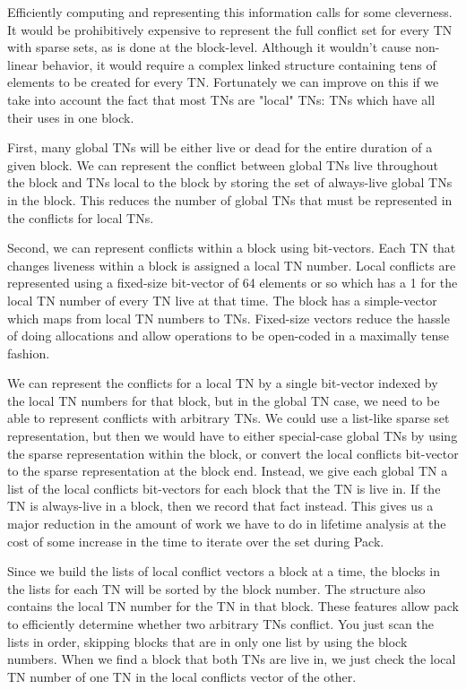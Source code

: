 Efficiently computing and representing this information calls for some
cleverness.  It would be prohibitively expensive to represent the full conflict
set for every TN with sparse sets, as is done at the block-level.  Although it
wouldn't cause non-linear behavior, it would require a complex linked structure
containing tens of elements to be created for every TN.  Fortunately we can
improve on this if we take into account the fact that most TNs are "local" TNs:
TNs which have all their uses in one block.

First, many global TNs will be either live or dead for the entire duration of a
given block.  We can represent the conflict between global TNs live throughout
the block and TNs local to the block by storing the set of always-live global
TNs in the block.  This reduces the number of global TNs that must be
represented in the conflicts for local TNs.

Second, we can represent conflicts within a block using bit-vectors.  Each TN
that changes liveness within a block is assigned a local TN number.  Local
conflicts are represented using a fixed-size bit-vector of 64 elements or so
which has a 1 for the local TN number of every TN live at that time.  The block
has a simple-vector which maps from local TN numbers to TNs.  Fixed-size
vectors reduce the hassle of doing allocations and allow operations to be
open-coded in a maximally tense fashion.

We can represent the conflicts for a local TN by a single bit-vector indexed by
the local TN numbers for that block, but in the global TN case, we need to be
able to represent conflicts with arbitrary TNs.  We could use a list-like
sparse set representation, but then we would have to either special-case global
TNs by using the sparse representation within the block, or convert the local
conflicts bit-vector to the sparse representation at the block end.  Instead,
we give each global TN a list of the local conflicts bit-vectors for each block
that the TN is live in.  If the TN is always-live in a block, then we record
that fact instead.  This gives us a major reduction in the amount of work we
have to do in lifetime analysis at the cost of some increase in the time to
iterate over the set during Pack.

Since we build the lists of local conflict vectors a block at a time, the
blocks in the lists for each TN will be sorted by the block number.  The
structure also contains the local TN number for the TN in that block.  These
features allow pack to efficiently determine whether two arbitrary TNs
conflict.  You just scan the lists in order, skipping blocks that are in only
one list by using the block numbers.  When we find a block that both TNs are
live in, we just check the local TN number of one TN in the local conflicts
vector of the other.

